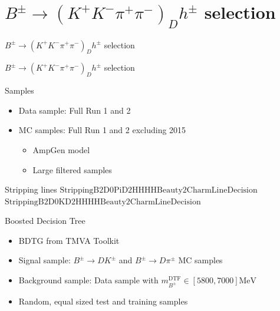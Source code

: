 \documentclass{beamer}
\begin{document}
\section{\texorpdfstring{$B^\pm\to(K^+K^-\pi^+\pi^-)_Dh^\pm$}{B to K+ K- pi+ pi- h} selection}
\begin{frame}{$B^\pm\to(K^+K^-\pi^+\pi^-)_Dh^\pm$ selection}
  \begin{center}
    {\huge $B^\pm\to(K^+K^-\pi^+\pi^-)_Dh^\pm$ selection}
  \end{center}
\end{frame}

\begin{frame}{Samples}
  \begin{itemize}
    \setlength\itemsep{1.2em}
    \item{Data sample: Full Run 1 and 2}
    \item{MC samples: Full Run 1 and 2 excluding 2015}
    \begin{itemize}
      \item{AmpGen model}
      \item{Large filtered samples}
    \end{itemize}
  \end{itemize}
  \begin{block}{Stripping lines}
    $\text{StrippingB2D0PiD2HHHHBeauty2CharmLineDecision}$ \\
    $\text{StrippingB2D0KD2HHHHBeauty2CharmLineDecision}$
  \end{block}
\end{frame}

\begin{frame}{Boosted Decision Tree}
  \begin{itemize}
    \setlength\itemsep{1.2em}
    \item{BDTG from TMVA Toolkit}
    \item{Signal sample: $B^\pm\to DK^\pm$ and $B^\pm\to D\pi^\pm$ MC samples}
    \item{Background sample: Data sample with $m_{B^\pm}^\text{DTF}\in[5800, 7000]\si{\mega\eV}$}
    \item{Random, equal sized test and training samples}
  \end{itemize}
\end{frame}
\end{document}
